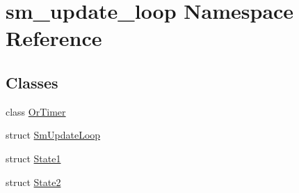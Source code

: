 \hypertarget{namespacesm__update__loop}{}\section{sm\+\_\+update\+\_\+loop Namespace Reference}
\label{namespacesm__update__loop}
\subsection*{Classes}
\begin{DoxyCompactItemize}
\item 
class \hyperlink{classsm__update__loop_1_1OrTimer}{Or\+Timer}
\item 
struct \hyperlink{structsm__update__loop_1_1SmUpdateLoop}{Sm\+Update\+Loop}
\item 
struct \hyperlink{structsm__update__loop_1_1State1}{State1}
\item 
struct \hyperlink{structsm__update__loop_1_1State2}{State2}
\end{DoxyCompactItemize}
